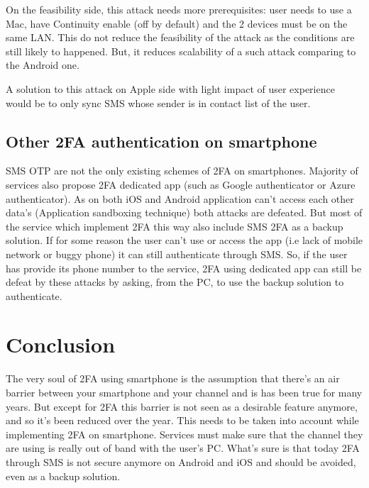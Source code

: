 \documentclass[11pt, a4paper,twocolumn]{article}
\begin{document}
On the feasibility side, this attack needs more prerequisites: user needs to use a Mac, have Continuity enable (off by default) and the 2 devices must be on the same LAN. This do not reduce the feasibility of the attack as the conditions are still likely to happened. But, it reduces scalability of a such attack comparing to the Android one.

A solution to this attack on Apple side with light impact of user experience would be to only sync SMS whose sender is in contact list of the user.

\subsection{Other 2FA authentication on smartphone}
SMS OTP are not the only existing schemes of 2FA on smartphones. Majority of services also propose 2FA dedicated app (such as Google authenticator or Azure authenticator). As on both iOS and Android application can't access each other data's (Application sandboxing technique) both attacks are defeated. But most of the service which implement 2FA this way also include SMS 2FA as a backup solution. If for some reason the user can't use or access the app (i.e lack of mobile network or buggy phone) it can still authenticate through SMS. So, if the user has provide its phone number to the service, 2FA using dedicated app can still be defeat by these attacks by asking, from the PC, to use the backup solution to authenticate.


\section{Conclusion}

The very soul of 2FA using smartphone is the assumption that there's an air barrier between your smartphone and your channel and is has been true for many years. But except for 2FA this barrier is not seen as a desirable feature anymore, and so it's been reduced over the year. This needs to be taken into account while implementing 2FA on smartphone. Services must make sure that the channel they are using is really out of band with the user's PC. What's sure is that today 2FA through SMS is not secure anymore on Android and iOS and should be avoided, even as a backup solution.

\clearpage
 

\end{document}
